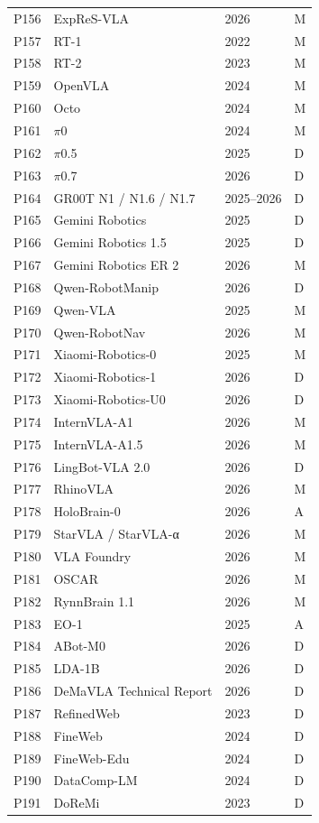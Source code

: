 \begin{longtable}{@{}p{1.3cm}p{11.8cm}p{2.2cm}p{1.2cm}@{}}
P156 & ExpReS-VLA & 2026 & M \\
P157 & RT-1 & 2022 & M \\
P158 & RT-2 & 2023 & M \\
P159 & OpenVLA & 2024 & M \\
P160 & Octo & 2024 & M \\
P161 & $\pi$0 & 2024 & M \\
P162 & $\pi$0.5 & 2025 & D \\
P163 & $\pi$0.7 & 2026 & D \\
P164 & GR00T N1 / N1.6 / N1.7 & 2025–2026 & D \\
P165 & Gemini Robotics & 2025 & D \\
P166 & Gemini Robotics 1.5 & 2025 & D \\
P167 & Gemini Robotics ER 2 & 2026 & M \\
P168 & Qwen-RobotManip & 2026 & D \\
P169 & Qwen-VLA & 2025 & M \\
P170 & Qwen-RobotNav & 2026 & M \\
P171 & Xiaomi-Robotics-0 & 2025 & M \\
P172 & Xiaomi-Robotics-1 & 2026 & D \\
P173 & Xiaomi-Robotics-U0 & 2026 & D \\
P174 & InternVLA-A1 & 2026 & M \\
P175 & InternVLA-A1.5 & 2026 & M \\
P176 & LingBot-VLA 2.0 & 2026 & D \\
P177 & RhinoVLA & 2026 & M \\
P178 & HoloBrain-0 & 2026 & A \\
P179 & StarVLA / StarVLA-α & 2026 & M \\
P180 & VLA Foundry & 2026 & M \\
P181 & OSCAR & 2026 & M \\
P182 & RynnBrain 1.1 & 2026 & M \\
P183 & EO-1 & 2025 & A \\
P184 & ABot-M0 & 2026 & D \\
P185 & LDA-1B & 2026 & D \\
P186 & DeMaVLA Technical Report & 2026 & D \\
P187 & RefinedWeb & 2023 & D \\
P188 & FineWeb & 2024 & D \\
P189 & FineWeb-Edu & 2024 & D \\
P190 & DataComp-LM & 2024 & D \\
P191 & DoReMi & 2023 & D \\

\end{longtable}
